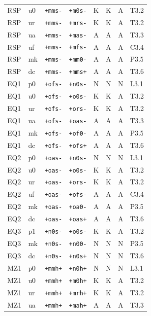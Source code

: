 {\begin{longtable}{@{}llllcccl@{}}
RSP & u0 & \texttt{+mms-} & \texttt{+m0s-} & K & K & A & T3.2 \\
RSP & ur & \texttt{+mms-} & \texttt{+mrs-} & K & K & A & T3.2 \\
RSP & ua & \texttt{+mms-} & \texttt{+mas-} & A & A & A & T3.3 \\
RSP & uf & \texttt{+mms-} & \texttt{+mfs-} & A & A & A & C3.4 \\
RSP & mk & \texttt{+mms-} & \texttt{+mm0-} & A & A & A & P3.5 \\
RSP & dc & \texttt{+mms-} & \texttt{+mms+} & A & A & A & T3.6 \\
EQ1 & p0 & \texttt{+ofs-} & \texttt{+n0s-} & N & N & N & L3.1 \\
EQ1 & u0 & \texttt{+ofs-} & \texttt{+o0s-} & K & K & A & T3.2 \\
EQ1 & ur & \texttt{+ofs-} & \texttt{+ors-} & K & K & A & T3.2 \\
EQ1 & ua & \texttt{+ofs-} & \texttt{+oas-} & A & A & A & T3.3 \\
EQ1 & mk & \texttt{+ofs-} & \texttt{+of0-} & A & A & A & P3.5 \\
EQ1 & dc & \texttt{+ofs-} & \texttt{+ofs+} & A & A & A & T3.6 \\
EQ2 & p0 & \texttt{+oas-} & \texttt{+n0s-} & N & N & N & L3.1 \\
EQ2 & u0 & \texttt{+oas-} & \texttt{+o0s-} & K & K & A & T3.2 \\
EQ2 & ur & \texttt{+oas-} & \texttt{+ors-} & K & K & A & T3.2 \\
EQ2 & uf & \texttt{+oas-} & \texttt{+ofs-} & A & A & A & C3.4 \\
EQ2 & mk & \texttt{+oas-} & \texttt{+oa0-} & A & A & A & P3.5 \\
EQ2 & dc & \texttt{+oas-} & \texttt{+oas+} & A & A & A & T3.6 \\
EQ3 & p1 & \texttt{+n0s-} & \texttt{+o0s-} & K & K & A & T3.2 \\
EQ3 & mk & \texttt{+n0s-} & \texttt{+n00-} & N & N & N & P3.5 \\
EQ3 & dc & \texttt{+n0s-} & \texttt{+n0s+} & N & N & N & T3.6 \\
MZ1 & p0 & \texttt{+mmh+} & \texttt{+n0h+} & N & N & N & L3.1 \\
MZ1 & u0 & \texttt{+mmh+} & \texttt{+m0h+} & K & K & A & T3.2 \\
MZ1 & ur & \texttt{+mmh+} & \texttt{+mrh+} & K & K & A & T3.2 \\
MZ1 & ua & \texttt{+mmh+} & \texttt{+mah+} & A & A & A & T3.3 \\

\end{longtable}}
